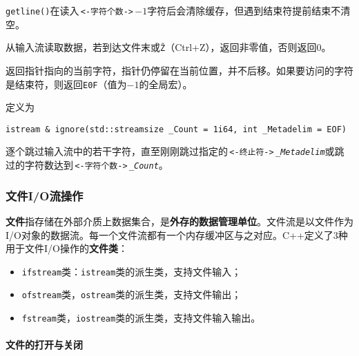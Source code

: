 \documentclass[10pt, a4paper, oneside, fontset=none]{ctexart}
\theoremstyle{plain}
\theoremstyle{definition}
\newcommand{\colors}[1]{\color{#1!75!black}}
\newcommand{\tboba}[1]{\textbf{\kai\color{bali!75!black}#1}}
\begin{document}
\begin{description}[leftmargin=2em, labelsep=1em, itemindent=-1em, itemsep=0pt, parsep=0pt, topsep=3pt, partopsep=0pt]
	\texttt{getline()}在读入\,\lstinline[style=intro]|<-字符个数->|\,$\mathop-1$字符后会清除缓存，但遇到结束符提前结束不清空。

	\item[\texttt{eof()}]
	从输入流读取数据，若到达文件末或\texttt{\^Z}（Ctrl+Z），返回非零值，否则返回0。

	\item[\texttt{peek()}]
	返回指针指向的当前字符，指针仍停留在当前位置，并不后移。如果要访问的字符是结束符，则返回\texttt{E0F}（值为$-1$的全局宏）。
	\item[\texttt{ignore()}] 
	定义为
\begin{lstlisting}[xleftmargin=1em, 
	moreemph={istream}, emphstyle=\colors{qinglv}, 
	moreemph={[2]{_Count, _Metadelim}}, emphstyle={[2]\it\ttfamily},]
	istream & ignore(std::streamsize _Count = 1i64, int _Metadelim = EOF)
\end{lstlisting}
	逐个跳过输入流中的若干字符，直至刚刚跳过指定的\,\lstinline[style=intro]|<-终止符->|\,\texttt{\textit{\_Metadelim}}或跳过的字符数达到\,\lstinline[style=intro]|<-字符个数->|\,\texttt{\textit{\_Count}}。
\end{description}

\subsubsection{文件I/O流操作}

\tboba{文件}指存储在外部介质上数据集合，是\textbf{外存的数据管理单位}。文件流是以文件作为I/O对象的数据流。每一个文件流都有一个内存缓冲区与之对应。C++定义了3种用于文件I/O操作的\tboba{文件类}：
\begin{itemize}[topsep=0pt]
	\item \texttt{ifstream}类：\texttt{istream}类的派生类，支持文件输入；
	\item \texttt{ofstream}类，\texttt{ostream}类的派生类，支持文件输出；
	\item \texttt{fstream}类，\texttt{iostream}类的派生类，支持文件输入输出。
\end{itemize}

\paragraph{文件的打开与关闭}
\end{document}
